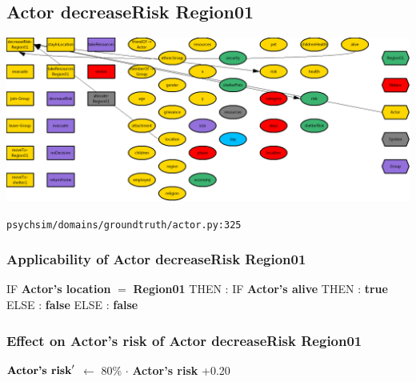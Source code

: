 \documentclass{article}%
\begin{document}
%
\subsection{Actor decreaseRisk Region01}%
\label{subsec:Actor decreaseRisk Region01}%
\includegraphics[width=\textwidth]{images/Actor-decreaseRisk-Region01.png}%
\begin{flushleft}%
\verb|psychsim/domains/groundtruth/actor.py:325|%
\end{flushleft}%
\subsubsection{Applicability of Actor decreaseRisk Region01}%
\label{ssubsec:Applicability of Actor decreaseRisk Region01}%
\begin{flushleft}%
IF %
\textbf{Actor's location}%
$=$%
\textbf{Region01}%
\linebreak%
\hspace*{2em}%
THEN %
: %
IF %
\textbf{Actor's alive}%
\linebreak%
\hspace*{4em}%
THEN %
: %
\textbf{true}%
\linebreak%
\hspace*{4em}%
ELSE %
: %
\textbf{false}%
\linebreak%
\hspace*{2em}%
ELSE %
: %
\textbf{false}%
\end{flushleft}

%
\subsubsection{Effect on Actor's risk of Actor decreaseRisk Region01}%
\label{ssubsec:Effect on Actor's risk of Actor decreaseRisk Region01}%
\begin{flushleft}%
$\mbox{\textbf{Actor's risk}} '$%
$\leftarrow$%
80\%%
$\cdot$%
\textbf{Actor's risk}%
+0.20%
\end{flushleft}
\end{document}
